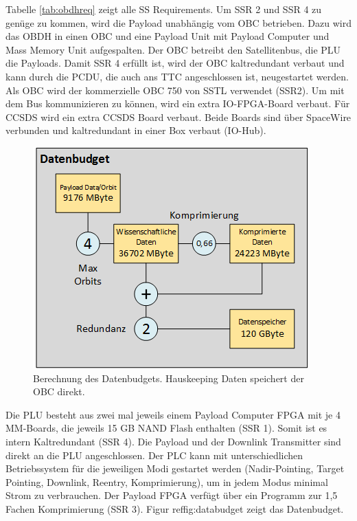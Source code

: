 \documentclass[twoside]{article}
\begin{document}
\begin{multicols}{2}
      Tabelle \ref{tab:obdhreq} zeigt alle SS Requirements. Um SSR 2 und
      SSR 4 zu genüge zu kommen, wird die Payload unabhängig vom OBC betrieben.
      Dazu wird das OBDH in einen OBC und eine Payload Unit mit Payload Computer
      und Mass Memory Unit aufgespalten. Der OBC betreibt den Satellitenbus, die PLU 
      die Payloads. Damit SSR 4 erfüllt ist, wird der OBC kaltredundant verbaut und
      kann durch die PCDU, die auch ans TTC angeschlossen ist, neugestartet werden.
      Als OBC wird der kommerzielle OBC 750 von SSTL verwendet (SSR2). Um mit dem
      Bus kommunizieren zu können, wird ein extra IO-FPGA-Board verbaut. Für CCSDS
      wird ein extra CCSDS Board verbaut. Beide Boards sind über SpaceWire verbunden
      und kaltredundant in einer Box verbaut (IO-Hub). 
      \begin{figure}[H]
         \captionsetup{format=plain}
         \centering
         \includegraphics[width=\linewidth]{Datenbudget.png}       
         \caption{Berechnung des Datenbudgets. Hauskeeping Daten speichert der OBC direkt.}
         \label{fig:databudget}
      \end{figure}
      Die PLU besteht aus zwei mal jeweils einem Payload Computer FPGA mit je 4
      MM-Boards, die jeweils 15 GB NAND Flash enthalten (SSR 1).
      Somit ist es intern Kaltredundant (SSR 4). Die Payload und der Downlink
      Transmitter sind direkt an die PLU angeschlossen. Der PLC kann mit
      unterschiedlichen Betriebssystem für die jeweiligen Modi gestartet
      werden (Nadir-Pointing, Target Pointing, Downlink, Reentry, Komprimierung),
      um in jedem Modus minimal Strom zu verbrauchen. Der Payload FPGA verfügt
      über ein Programm zur 1,5 Fachen Komprimierung (SSR 3). 
      Figur ref{fig:databudget} zeigt das Datenbudget.


\end{multicols}
\end{document}
